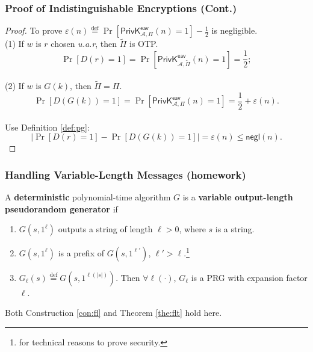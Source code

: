 \begin{frame}\frametitle{Proof of Indistinguishable Encryptions (Cont.)}
\begin{proof}
To prove $ \varepsilon(n) \overset{\text{def}}{=} \Pr[\mathsf{PrivK}^{\mathsf{eav}}_{\mathcal{A},\Pi}(n)=1] - \frac{1}{2} $ is negligible.\\
(1) If $w$ is $r$ chosen \emph{u.a.r}, then $\tilde{\Pi}$ is OTP. \[\Pr[D(r)=1] = \Pr[\mathsf{PrivK}^{\mathsf{eav}}_{\mathcal{A},\tilde{\Pi}}(n)=1]=\frac{1}{2};\] \\
(2) If $w$ is $G(k)$, then $\tilde{\Pi} = \Pi$. 
\[ \Pr[D(G(k))=1] = \Pr[\mathsf{PrivK}^{\mathsf{eav}}_{\mathcal{A},\Pi}(n)=1] = \frac{1}{2} + \varepsilon(n). \]\\
Use Definition \ref{def:pg}: 
\[ \left|\Pr[D(r)=1] - \Pr[D(G(k))=1]\right| = \varepsilon(n) \le \mathsf{negl}(n).
\] 
\end{proof}
\end{frame}
\begin{frame}\frametitle{Handling Variable-Length Messages (homework)}
\begin{definition}\label{def:vlpg}
A \textbf{deterministic} polynomial-time algorithm $G$ is a \textbf{variable output-length pseudorandom generator} if
\begin{enumerate}
\item $G(s, 1^{\ell})$ outputs a string of length $\ell > 0$, where $s$ is a string.
\item $G(s, 1^{\ell})$ is a prefix of $G(s, 1^{\ell'})$, $\ell' > \ell$.\footnote{for technical reasons to prove security.}
\item $G_{\ell}(s) \overset{\text{def}}{=} G(s,1^{\ell(|s|)})$. Then $\forall \ell(\cdot)$, $G_{\ell}$ is a PRG with expansion factor $\ell$.
\end{enumerate}
\end{definition}
Both Construction \ref{con:fl} and Theorem \ref{the:flt} hold here.
\end{frame}
